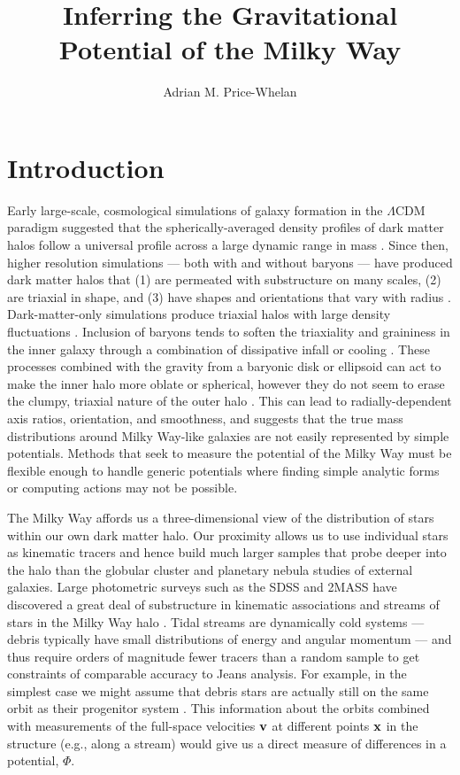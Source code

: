 \documentclass[letterpaper,12pt,preprint]{aastex}
\begin{document}
\title{Inferring the Gravitational Potential of the Milky Way}
\author{Adrian M. Price-Whelan}

\section{Introduction}

Early large-scale, cosmological simulations of galaxy formation in the $\Lambda$CDM paradigm suggested that the spherically-averaged density profiles of dark matter halos follow a universal profile across a large dynamic range in mass \citep{navarro96}. Since then, higher resolution simulations --- both with and without baryons --- have produced dark matter halos that (1) are permeated with substructure on many scales, (2) are triaxial in shape, and (3) have shapes and orientations that vary with radius \citep{dubinski91, jing02, kuhlen07, veraciro11}. Dark-matter-only simulations produce triaxial halos \citep{jing02} with large density fluctuations \citep{zemp09}. Inclusion of baryons tends to soften the triaxiality and graininess in the inner galaxy through a combination of dissipative infall \citep{dubinski94} or cooling \citep{bryan13}. These processes combined with the gravity from a baryonic disk or ellipsoid can act to make the inner halo more oblate or spherical, however they do not seem to erase the clumpy, triaxial nature of the outer halo \citep[e.g.,][]{pontzen12}. This can lead to radially-dependent axis ratios, orientation, and smoothness, and suggests that the true mass distributions around Milky Way-like galaxies are not easily represented by simple potentials. Methods that seek to measure the potential of the Milky Way must be flexible enough to handle generic potentials where finding simple analytic forms or computing actions may not be possible.

The Milky Way affords us a three-dimensional view of the distribution of stars within our own dark matter halo. Our proximity allows us to use individual stars as kinematic tracers and hence build much larger samples that probe deeper into the halo than the globular cluster and planetary nebula studies of external galaxies. Large photometric surveys such as the SDSS and 2MASS \citep{skrutskie06} have discovered a great deal of substructure in kinematic associations and streams of stars in the Milky Way halo \citep[e.g.,][]{belokurov06, rochapinto04}. Tidal streams are dynamically cold systems --- debris typically have small distributions of energy and angular momentum --- and thus require orders of magnitude fewer tracers than a random sample to get constraints of comparable accuracy to Jeans analysis. For example, in the simplest case we might assume that debris stars are actually still on the same orbit as their progenitor system \citep[a \emph{wrong} assumption, see e.g.,][]{eyre11}. This information about the orbits combined with measurements of the full-space velocities ${\bf v}$ at different points ${\bf x}$ in the structure (e.g., along a stream) would give us a direct measure of differences in a potential, $\Phi$.
\end{document}
